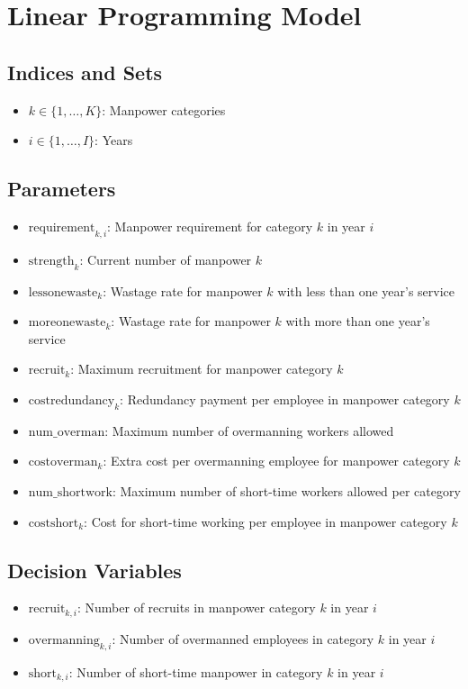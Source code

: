 \documentclass{article}
\begin{document}
\section*{Linear Programming Model}

\subsection*{Indices and Sets}
\begin{itemize}
    \item $k \in \{1, \ldots, K\}$: Manpower categories
    \item $i \in \{1, \ldots, I\}$: Years
\end{itemize}

\subsection*{Parameters}
\begin{itemize}
    \item $\text{requirement}_{k, i}$: Manpower requirement for category $k$ in year $i$
    \item $\text{strength}_{k}$: Current number of manpower $k$
    \item $\text{lessonewaste}_{k}$: Wastage rate for manpower $k$ with less than one year's service
    \item $\text{moreonewaste}_{k}$: Wastage rate for manpower $k$ with more than one year's service
    \item $\text{recruit}_{k}$: Maximum recruitment for manpower category $k$
    \item $\text{costredundancy}_{k}$: Redundancy payment per employee in manpower category $k$
    \item $\text{num\_overman}$: Maximum number of overmanning workers allowed
    \item $\text{costoverman}_{k}$: Extra cost per overmanning employee for manpower category $k$
    \item $\text{num\_shortwork}$: Maximum number of short-time workers allowed per category
    \item $\text{costshort}_{k}$: Cost for short-time working per employee in manpower category $k$
\end{itemize}

\subsection*{Decision Variables}
\begin{itemize}
    \item $\text{recruit}_{k, i}$: Number of recruits in manpower category $k$ in year $i$
    \item $\text{overmanning}_{k, i}$: Number of overmanned employees in category $k$ in year $i$
    \item $\text{short}_{k, i}$: Number of short-time manpower in category $k$ in year $i$
\end{itemize}
\end{document}
